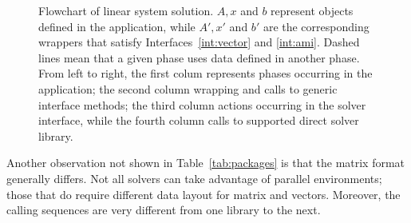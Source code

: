 \documentclass[acmtocl]{acmtrans2m}
\begin{document}
\begin{figure}
\begin{center}
\end{center}
\caption{Flowchart of linear system solution. $A, x$ and $b$ represent objects
  defined in the application, while $A', x'$ and $b'$ are the corresponding 
    wrappers that
    satisfy Interfaces~\ref{int:vector} and \ref{int:ami}. Dashed lines mean
    that a given phase uses data defined in another phase. From left to right,
  the first colum 
    represents phases occurring in the application; the second column wrapping
and calls to generic interface methods; the third column actions
occurring in the solver interface, while the fourth column calls to supported
direct solver library.}
\label{fig:flowchart}
\end{figure}

Another observation not shown in Table~\ref{tab:packages} is that the matrix
format generally differs. Not all solvers can take advantage of
parallel environments; those that do require different data layout
for matrix and
vectors. Moreover, the calling sequences are very different from one library
to the next.
\end{document}
